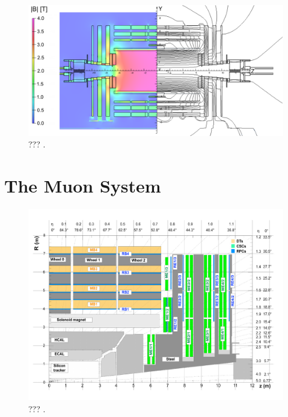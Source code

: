     \begin{figure}[h!]
      \centering
      \includegraphics[width=\textwidth]{img/I-3-cms/magnet.png}
      \caption{??? \cite{Chatrchyan:2009si}.}
      \label{fig:I-3-cms-magnet}
    \end{figure}

  \section{The Muon System}

    \begin{figure}[h!]
      \centering
      \includegraphics[width=\textwidth]{img/I-3-cms/quadrant-postls1.pdf}
      \caption{??? \cite{1748-0221-3-08-S08004}.}
      \label{fig:I-3-cms-quadrant}
    \end{figure}

